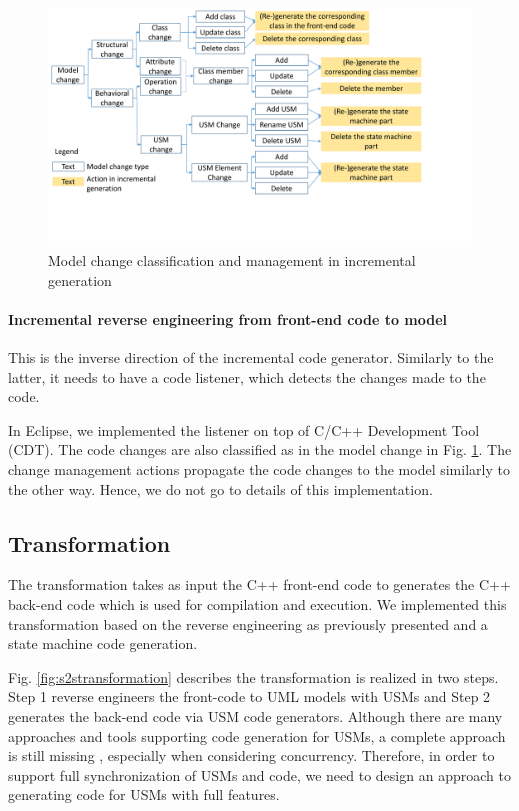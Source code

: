 \begin{figure}
	\centering
	\includegraphics[clip, trim=0.2cm 4cm 4.0cm 0.2cm, width=1\columnwidth]{figures/modelchange.pdf}
	\caption{Model change classification and management in incremental generation} 
	\label{fig:modelchange}
\end{figure}

\noindent
\paragraph{Incremental reverse engineering from front-end code to model}
This is the inverse direction of the incremental code generator.
Similarly to the latter, it needs to have a code listener, which detects the changes made to the code.

In Eclipse, we implemented the listener on top of C/C++ Development Tool (CDT).
The code changes are also classified as in the model change in Fig. \ref{fig:modelchange}.
The change management actions propagate the code changes to the model similarly to the other way.
Hence, we do not go to details of this implementation. 

\subsection{Transformation}
The transformation takes as input the C++ front-end code to generates the C++ back-end code which is used for compilation and execution.
We implemented this transformation based on the reverse engineering as previously presented and a state machine code generation. 

Fig. \ref{fig:s2stransformation} describes the transformation is realized in two steps.
Step 1 reverse engineers the front-code to UML models with USMs and Step 2 generates the back-end code via USM code generators.
Although there are many approaches and tools supporting code generation for USMs, a complete approach is still missing \cite{Badreddin2014}, especially when considering concurrency.
Therefore, in order to support full synchronization of USMs and code, we need to design an approach to generating code for USMs with full features. 

